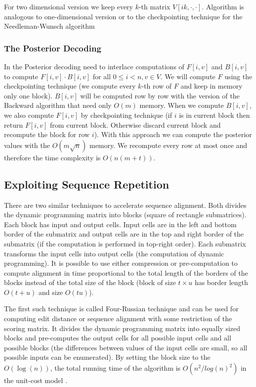 For two dimensional version we keep every $k$-th matrix $V[ik,\cdot,\cdot]$.
Algorithm is analogous to one-dimensional version or to the checkpointing
technique for the Needleman-Wunsch algorithm


\subsubsection{The Posterior Decoding}

In the Posterior decoding need to interlace computations of $F[i,v]$ and
$B[i,v]$ to compute $F[i,v]\cdot B[i,v]$ for all $0\leq i<n,v\in V$. We will
compute $F$ using the checkpointing technique (we compute every $k$-th row of
$F$ and keep in memory only one block).  $B[i,v]$ will be computed row by row
with the version of the  Backward algorithm that need only $O(m)$ memory. When
we compute $B[i,v]$, we also compute $F[i,v]$ by checkpointing technique (if $i$ is in
current block then return $F[i,v]$ from current block. Otherwise discard current
block and recompute the block for row $i$). With this approach we can
compute the posterior values with the $O(m\sqrt n)$ memory. We recompute every row at most
once and therefore the time complexity is $O(n(m+t))$.

\subsection{Exploiting Sequence Repetition}

There are two similar techniques to accelerate sequence alignment. Both divides
the dynamic programming matrix into blocks (square of rectangle submatrices).
Each block has input and output cells. Input cells are in the left and bottom
border of the submatrix and output cells are in the top and right border of the
submatrix (if the computation is performed in top-right order). Each submatrix
transforms the input cells into output cells (the computation of dynamic
programming). It is possible to use either compression or pre-computation to
compute alignment in time proportional to the total length of the borders of
the blocks instead of the total size of the block (block of size $t\times u$
has border length $O(t+u)$ and size $O(tu)$).

The first such technique is called Four-Russian technique \cite{Arlazaroff1970,
GusfieldBook} and can be used for computing edit distance or sequence alignment
with some restriction of the scoring matrix. It divides the dynamic programming
matrix into equally sized blocks and pre-computes the output cells for all
possible input cells and all possible blocks (the differences between values of
the input cells are small, so all possible inputs can be enumerated). By
setting the block size to the $O(\log(n))$, the total running time of the
algorithm is $O(n^2/log(n)^2)$ in the unit-cost model \cite{GusfieldBook}.

